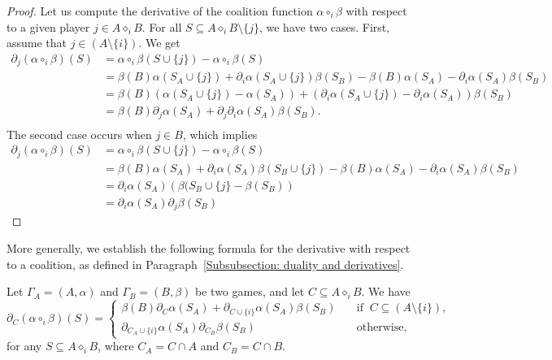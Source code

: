 \documentclass[a4paper,12pt]{amsart}
\begin{document}
\begin{proof}
    Let us compute the derivative of the coalition function \(\alpha \circ_i \beta\) with respect to a given player \(j \in A \diamond_i B\). For all \(S \subseteq A \diamond_i B \setminus \{j\}\), we have two cases. First, assume that \(j \in (A\setminus \{i\})\). We get
    \[ \begin{aligned} 
    \partial_j (\alpha \circ_i \beta)(S) & = \alpha \circ_i \beta(S \cup \{j\}) - \alpha \circ_i \beta(S) \\
    & = \beta(B) \alpha(S_A \cup \{j\}) + \partial_i \alpha(S_A \cup \{j\}) \beta(S_B) - \beta(B) \alpha(S_A) - \partial_i \alpha(S_A) \beta(S_B) \\
    & = \beta(B) \left( \alpha(S_A \cup \{j\}) - \alpha(S_A) \right) + \left( \partial_i \alpha(S_A \cup \{j\}) - \partial_i \alpha(S_A) \right) \beta(S_B) \\
    & = \beta(B) \partial_j \alpha(S_A) + \partial_j \partial_i \alpha(S_A) \beta(S_B). \\
    \end{aligned} \]
    The second case occurs when \(j \in B\), which implies 
    \[ \begin{aligned} 
    \partial_j (\alpha \circ_i \beta)(S) & = \alpha \circ_i \beta(S \cup \{j\}) -\alpha \circ_i \beta(S) \\ 
    & = \beta(B) \alpha(S_A) + \partial_i \alpha(S_A) \beta(S_B \cup \{j\}) - \beta(B) \alpha(S_A) - \partial_i \alpha(S_A) \beta(S_B) \\
    & = \partial_i \alpha(S_A) \left( \beta(S_B \cup \{j\} - \beta(S_B) \right) \\
    & = \partial_i \alpha(S_A) \partial_j \beta(S_B)
    \end{aligned} \]
\end{proof}

More generally, we establish the following formula for the derivative with respect to a coalition, as defined in Paragraph~\ref{Subsubsection: duality and derivatives}.

\begin{proposition}\label{Proposition: dérivée itérée}
Let $\Gamma_A = (A, \alpha)$ and $\Gamma_B = (B, \beta)$ be two games, and let $C \subseteq A \diamond_i B$. We have
\[
\partial_{C}(\alpha \circ_i \beta)(S) = \begin{cases} 
    \beta(B)\partial_{C}\alpha(S_A) + \partial_{C \cup \{i\}}\alpha(S_A)\beta(S_B) & \quad \text{if } \  C \subseteq (A \setminus \{i\}), \\ 
    \partial_{C_A \cup \{i\}}\alpha(S_A)\partial_{C_B}\beta(S_B)& \quad \text{otherwise},
\end{cases}
\]
for any $S \subseteq A \diamond_i B$, where $C_A = C \cap A$ and $C_B = C \cap B$. 
\end{proposition}
\end{document}
